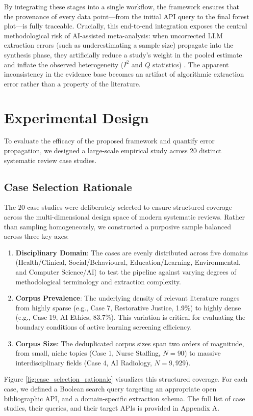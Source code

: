 \documentclass[12pt]{article}
\begin{document}
By integrating these stages into a single workflow, the framework ensures that the provenance of every data point---from the initial API query to the final forest plot---is fully traceable. Crucially, this end-to-end integration exposes the central methodological risk of AI-assisted meta-analysis: when uncorrected LLM extraction errors (such as underestimating a sample size) propagate into the synthesis phase, they artificially reduce a study's weight in the pooled estimate and inflate the observed heterogeneity ($I^2$ and $Q$ statistics) \cite{higgins2002heterogeneity, dersimonian1986metaanalysis}. The apparent inconsistency in the evidence base becomes an artifact of algorithmic extraction error rather than a property of the literature.

\section{Experimental Design}

To evaluate the efficacy of the proposed framework and quantify error propagation, we designed a large-scale empirical study across 20 distinct systematic review case studies. 

\subsection{Case Selection Rationale}

The 20 case studies were deliberately selected to ensure structured coverage across the multi-dimensional design space of modern systematic reviews. Rather than sampling homogeneously, we constructed a purposive sample balanced across three key axes:
\begin{enumerate}
    \item \textbf{Disciplinary Domain}: The cases are evenly distributed across five domains (Health/Clinical, Social/Behavioural, Education/Learning, Environmental, and Computer Science/AI) to test the pipeline against varying degrees of methodological terminology and extraction complexity.
    \item \textbf{Corpus Prevalence}: The underlying density of relevant literature ranges from highly sparse (e.g., Case 7, Restorative Justice, 1.9\%) to highly dense (e.g., Case 19, AI Ethics, 83.7\%). This variation is critical for evaluating the boundary conditions of active learning screening efficiency.
    \item \textbf{Corpus Size}: The deduplicated corpus sizes span two orders of magnitude, from small, niche topics (Case 1, Nurse Staffing, $N=90$) to massive interdisciplinary fields (Case 4, AI Radiology, $N=9,929$).
\end{enumerate}
Figure \ref{fig:case_selection_rationale} visualizes this structured coverage. For each case, we defined a Boolean search query targeting an appropriate open bibliographic API, and a domain-specific extraction schema. The full list of case studies, their queries, and their target APIs is provided in Appendix A. 
\end{document}
